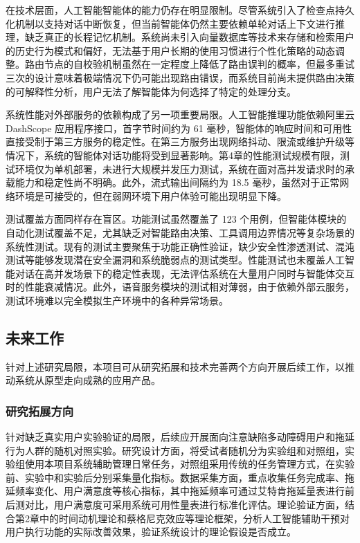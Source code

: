 \par 在技术层面，人工智能智能体的能力仍存在明显限制。尽管系统引入了检查点持久化机制以支持对话中断恢复，但当前智能体仍然主要依赖单轮对话上下文进行推理，缺乏真正的长程记忆机制。系统尚未引入向量数据库等技术来存储和检索用户的历史行为模式和偏好，无法基于用户长期的使用习惯进行个性化策略的动态调整。路由节点的自校验机制虽然在一定程度上降低了路由误判的概率，但最多重试三次的设计意味着极端情况下仍可能出现路由错误，而系统目前尚未提供路由决策的可解释性分析，用户无法了解智能体为何选择了特定的处理分支。

\par 系统性能对外部服务的依赖构成了另一项重要局限。人工智能推理功能依赖阿里云 DashScope 应用程序接口，首字节时间约为 61 毫秒，智能体的响应时间和可用性直接受制于第三方服务的稳定性。在第三方服务出现网络抖动、限流或维护升级等情况下，系统的智能体对话功能将受到显著影响。第4章的性能测试规模有限，测试环境仅为单机部署，未进行大规模并发压力测试，系统在面对高并发请求时的承载能力和稳定性尚不明确。此外，流式输出间隔约为 18.5 毫秒，虽然对于正常网络环境是可接受的，但在弱网环境下用户体验可能出现明显下降。

\par 测试覆盖方面同样存在盲区。功能测试虽然覆盖了 123 个用例，但智能体模块的自动化测试覆盖不足，尤其缺乏对智能路由决策、工具调用边界情况等复杂场景的系统性测试。现有的测试主要聚焦于功能正确性验证，缺少安全性渗透测试、混沌测试等能够发现潜在安全漏洞和系统脆弱点的测试类型。性能测试也未覆盖人工智能对话在高并发场景下的稳定性表现，无法评估系统在大量用户同时与智能体交互时的性能衰减情况。此外，语音服务模块的测试相对薄弱，由于依赖外部云服务，测试环境难以完全模拟生产环境中的各种异常场景。

\subsection{未来工作}

\par 针对上述研究局限，本项目可从研究拓展和技术完善两个方向开展后续工作，以推动系统从原型走向成熟的应用产品。

\subsubsection{研究拓展方向}

\par 针对缺乏真实用户实验验证的局限，后续应开展面向注意缺陷多动障碍用户和拖延行为人群的随机对照实验。研究设计方面，将受试者随机分为实验组和对照组，实验组使用本项目系统辅助管理日常任务，对照组采用传统的任务管理方式，在实验前、实验中和实验后分别采集量化指标。数据采集方面，重点收集任务完成率、拖延频率变化、用户满意度等核心指标，其中拖延频率可通过艾特肯拖延量表进行前后测对比，用户满意度可采用系统可用性量表进行标准化评估。理论验证方面，结合第2章中的时间动机理论和蔡格尼克效应等理论框架，分析人工智能辅助干预对用户执行功能的实际改善效果，验证系统设计的理论假设是否成立。

